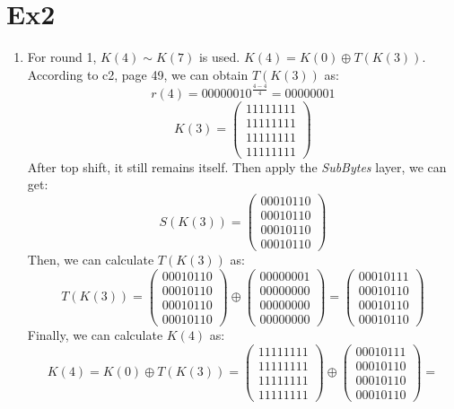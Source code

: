 \documentclass[12pt, a4paper]{article}
\begin{document}
\section*{Ex2}
\begin{enumerate}
    \item For round 1, $K(4) \sim K(7)$ is used.
          $K(4) = K(0) \oplus T(K(3))$. According to c2, page 49, we can obtain $T(K(3))$ as:\newline
          $$r(4) = 00000010^{\frac{4-4}{4}} = 00000001$$
          $$K(3) = \begin{pmatrix} 11111111\\ 11111111\\ 11111111\\ 11111111 \end{pmatrix}$$
          After top shift, it still remains itself. Then apply the \emph{SubBytes} layer, we can get:
          $$S(K(3)) = \begin{pmatrix} 00010110\\ 00010110\\ 00010110\\ 00010110 \end{pmatrix}$$
          Then, we can calculate $T(K(3))$ as:
          $$T(K(3)) = \begin{pmatrix} 00010110\\ 00010110\\ 00010110\\ 00010110\end{pmatrix} \oplus 
          \begin{pmatrix} 00000001\\ 00000000\\ 00000000\\ 00000000\end{pmatrix} = 
          \begin{pmatrix} 00010111\\ 00010110\\ 00010110\\ 00010110 \end{pmatrix}$$
          Finally, we can calculate $K(4)$ as:
          $$K(4) = K(0) \oplus T(K(3)) = \begin{pmatrix} 11111111\\ 11111111\\ 11111111\\ 11111111 \end{pmatrix}
          \oplus \begin{pmatrix} 00010111\\ 00010110\\ 00010110\\ 00010110\end{pmatrix} = 
$$
\end{enumerate}
\end{document}
